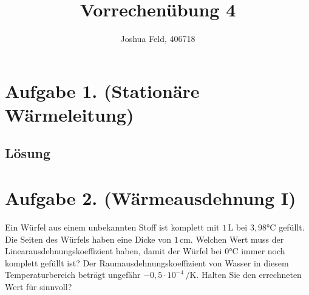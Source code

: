 \documentclass[german,12pt]{homework}
\title{Vorrechenübung 4}
\author{Joshua Feld, 406718}
\institute{RWTH Aachen University\\Lehrstuhl für computergestützte Analyse
technischer Systeme}
\newcommand{\sis}[1]{\,\si{#1}}
\newcommand{\degC}{\si{\degreeCelsius}}
\begin{document}
    \maketitle

    \section*{Aufgabe 1. (Stationäre Wärmeleitung)}

    \begin{problem}
        \begin{center}
        \end{center}
    \end{problem}

    \subsection*{Lösung}

    \section*{Aufgabe 2. (Wärmeausdehnung I)}

    \begin{problem}
        Ein Würfel aus einem unbekannten Stoff ist komplett mit
        \(1\sis{\liter}\) bei \(3,98\degC\) gefüllt. Die Seiten des Würfels
        haben eine Dicke von \(1\sis{\centi\meter}\). Welchen Wert muss der
        Linearausdehnungskoeffizient haben, damit der Würfel bei \(0\degC\)
        immer noch komplett gefüllt ist? Der Raumausdehnungskoeffizient von
        Wasser in diesem Temperaturbereich beträgt ungefähr \(-0,5 \cdot 10^{-4}
        \sis{\per\kelvin}\). Halten Sie den errechneten Wert für sinnvoll?
    \end{problem}
\end{document}
